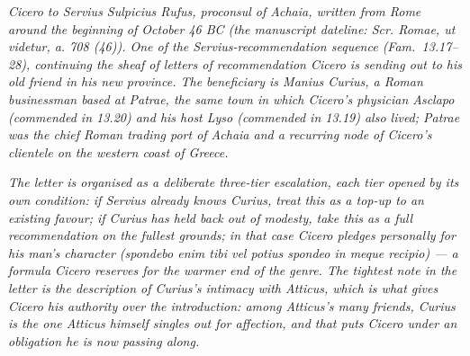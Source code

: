 
\textit{Cicero to Servius Sulpicius Rufus, proconsul of
Achaia, written from Rome around the beginning of October
46 BC (the manuscript dateline: \textit{Scr. Romae, ut
videtur, a. 708 (46)}). One of the Servius-recommendation
sequence (Fam.\ 13.17--28), continuing the sheaf of letters
of recommendation Cicero is sending out to his old friend
in his new province. The beneficiary is Manius Curius, a
Roman businessman based at Patrae, the same town in which
Cicero's physician Asclapo (commended in 13.20) and his
host Lyso (commended in 13.19) also lived; Patrae was the
chief Roman trading port of Achaia and a recurring node
of Cicero's clientele on the western coast of Greece.}

\textit{The letter is organised as a deliberate
three-tier escalation, each tier opened by its own
condition: if Servius already knows Curius, treat this as
a top-up to an existing favour; if Curius has held back
out of modesty, take this as a full recommendation on the
fullest grounds; in that case Cicero pledges personally
for his man's character (\textit{spondebo enim tibi vel
potius spondeo in meque recipio}) --- a formula Cicero
reserves for the warmer end of the genre. The tightest
note in the letter is the description of Curius's
intimacy with Atticus, which is what gives Cicero his
authority over the introduction: among Atticus's many
friends, Curius is the one Atticus himself singles out
for affection, and that puts Cicero under an obligation
he is now passing along.}
